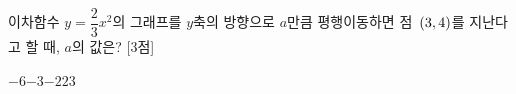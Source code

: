 이차함수 $y=\dfrac{2}{3}x^2$의 그래프를 $y$축의 방향으로 $a$만큼 평행이동하면 점~$(3{,}\mkern3mu 4)$를 지난다고 할 때, $a$의 값은? \mbox{[3점]}
\begin{choices32}{$-6$}{$-3$}{$-2$}{$2$}{$3$}\end{choices32}
